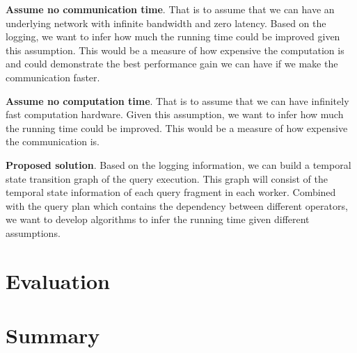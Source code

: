 \documentclass[11pt]{scrartcl}
\begin{document}
\noindent\textbf{Assume no communication time}.  That is to assume that we can have an underlying network with infinite bandwidth and zero latency. Based on the logging, we want to infer how much the running time could be improved given this assumption. This would be a measure of how expensive the computation is and could demonstrate the best performance gain we can have if we make the communication faster.

\noindent\textbf{Assume no computation time}.  That is to assume that we can have infinitely fast computation hardware. Given this assumption, we want to infer how much the running time could be improved. This would be a measure of how expensive the communication is.

\noindent\textbf{Proposed solution}.  Based on the logging information, we can build a temporal state transition graph of the query execution. This graph will consist of the temporal state information of each query fragment in each worker. Combined with the query plan which contains the dependency between different operators, we want to develop algorithms to infer the running time given different assumptions.

\section{Evaluation}

\section{Summary}


\label{sec:outlook}




\end{document}
